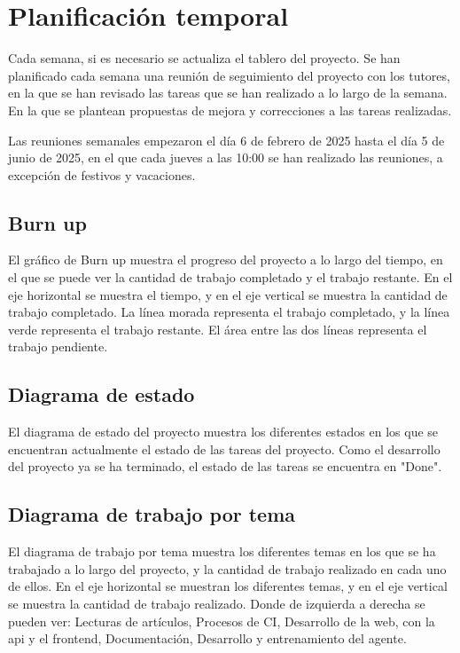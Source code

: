\section{Planificación temporal}
Cada semana, si es necesario se actualiza el tablero del proyecto.
Se han planificado cada semana una reunión de seguimiento del proyecto con los tutores, en la que se han revisado las tareas que se han realizado a lo largo de la semana. En la que se plantean propuestas de mejora y correcciones a las tareas realizadas.

Las reuniones semanales empezaron el día 6 de febrero de 2025 hasta el día 5 de junio de 2025, en el que cada jueves a las 10:00 se han realizado las reuniones, a excepción de festivos y vacaciones.

\subsection{Burn up}
El gráfico de Burn up muestra el progreso del proyecto a lo largo del tiempo, en el que se puede ver la cantidad de trabajo completado y el trabajo restante. En el eje horizontal se muestra el tiempo, y en el eje vertical se muestra la cantidad de trabajo completado. La línea morada representa el trabajo completado, y la línea verde representa el trabajo restante. El área entre las dos líneas representa el trabajo pendiente.

\subsection{Diagrama de estado}
El diagrama de estado del proyecto muestra los diferentes estados en los que se encuentran actualmente el estado de las tareas del proyecto. Como el desarrollo del proyecto ya se ha terminado, el estado de las tareas se encuentra en "Done".

\subsection{Diagrama de trabajo por tema}
El diagrama de trabajo por tema muestra los diferentes temas en los que se ha trabajado a lo largo del proyecto, y la cantidad de trabajo realizado en cada uno de ellos. En el eje horizontal se muestran los diferentes temas, y en el eje vertical se muestra la cantidad de trabajo realizado.
Donde de izquierda a derecha se pueden ver: Lecturas de artículos,  Procesos de CI, Desarrollo de la web, con la api y el frontend, Documentación, Desarrollo y entrenamiento del agente.



